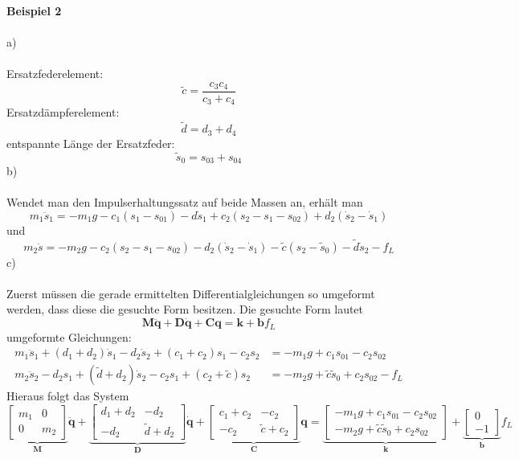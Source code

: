 \newpage
\noindent
\textbf{Beispiel 2}\\ \\
a) \\ \\
Ersatzfederelement:
\[
	\tilde{c} = \frac{c_3c_4}{c_3 + c_4}
\]
Ersatzdämpferelement:
\[
	\tilde{d} = d_3 + d_4
\]
entspannte Länge der Ersatzfeder:
\[
	\tilde{s}_0 = s_{03} + s_{04}
\]
b) \\ \\
Wendet man den Impulserhaltungssatz auf beide Massen an, erhält man
\[
	m_1\ddot{s}_1 = -m_1 g - c_1(s_1 - s_{01}) - d\dot{s}_1 + c_2(s_2 - s_1 - s_{02}) + d_2(\dot{s}_2 - \dot{s}_1)
\]
und
\[
	m_2\ddot{s} = -m_2 g - c_2(s_2 - s_1 - s_{02}) - d_2(\dot{s}_2 - \dot{s}_1) - \tilde{c}(s_2 - \tilde{s}_0) - \tilde{d}\dot{s}_2 - f_L
\]
c)\\ \\
Zuerst müssen die gerade ermittelten Differentialgleichungen so umgeformt werden, dass diese die gesuchte Form besitzen. Die gesuchte Form lautet
\[
	\textbf{M}\ddot{\textbf{q}} + \textbf{D}\dot{\textbf{q}} + \textbf{C}\textbf{q} = \textbf{k} + \textbf{b}f_L
\]
umgeformte Gleichungen:
\begin{align*}
	m_1\ddot{s}_1 + (d_1 + d_2)\dot{s}_1 - d_2\dot{s}_2 + (c_1 + c_2)s_1 - c_2 s_2 &= -m_1g + c_1s_{01} - c_2s_{02} \\
	m_2\ddot{s}_2 - d_2s_1 + (\tilde{d} + d_2)\dot{s}_2 - c_2s_1 +(c_2 + \tilde{c})s_2 &= -m_2g + \tilde{c}\tilde{s}_0 + c_2s_{02} - f_L
\end{align*}
Hieraus folgt das System
\[
	\underbrace{\begin{bmatrix}
			m_1 & 0 \\
			0 & m_2
		\end{bmatrix}}_{\textbf{M}}\ddot{\textbf{q}}
	+
	\underbrace{\begin{bmatrix}
			d_1 + d_2 & -d_2 \\
			-d_2 & \tilde{d} + d_2
		\end{bmatrix}}_{\textbf{D}} \dot{\textbf{q}}
	+
	\underbrace{\begin{bmatrix}
			c_1 + c_2 & -c_2 \\
			-c_2 & \tilde{c} + c_2
		\end{bmatrix}}_{\textbf{C}}\textbf{q}
	=
	\underbrace{\begin{bmatrix}
			-m_1g + c_1s_{01} - c_2s_{02} \\
			-m_2g + \tilde{c}\tilde{s}_0 + c_2s_{02}
		\end{bmatrix}}_{\textbf{k}}
	+ 
	\underbrace{\begin{bmatrix}
			0 \\
			-1
		\end{bmatrix}}_{\textbf{b}} f_L
\]
